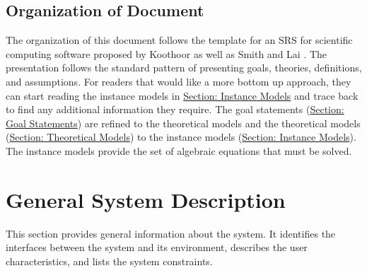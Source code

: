\documentclass[12pt]{article}
\begin{document}
\subsection{Organization of Document}
\label{Sec:DocOrg}
The organization of this document follows the template for an SRS for scientific computing software proposed by Koothoor \cite{koothoor2013} as well as Smith and Lai \cite{smithLai2005}. The presentation follows the standard pattern of presenting goals, theories, definitions, and assumptions. For readers that would like a more bottom up approach, they can start reading the instance models in \hyperref[Sec:IMs]{Section: Instance Models} and trace back to find any additional information they require.
The goal statements (\hyperref[Sec:GoalStmt]{Section: Goal Statements}) are refined to the theoretical models and the theoretical models (\hyperref[Sec:TMs]{Section: Theoretical Models}) to the instance models (\hyperref[Sec:IMs]{Section: Instance Models}). The instance models provide the set of algebraic equations that must be solved.
\section{General System Description}
\label{Sec:GenSysDesc}
This section provides general information about the system. It identifies the interfaces between the system and its environment, describes the user characteristics, and lists the system constraints.
\end{document}
